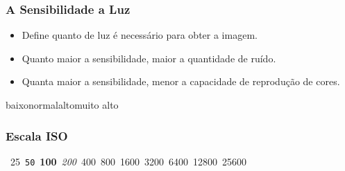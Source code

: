 
\begin{frame}
    \frametitle{A Sensibilidade a Luz}
    \begin{itemize}
        \item Define quanto de luz é necessário para obter a imagem.
        \item Quanto maior a sensibilidade, maior a quantidade de ruído.
        \item Quanta maior a sensibilidade, menor a capacidade de reprodução de cores.
    \end{itemize}
\end{frame}

\begin{frame}
    \hspace{0.5cm}baixo\hspace{0.5cm}normal\hspace{2cm}alto\hspace{3cm}muito alto
    \frametitle{Escala ISO}
    \vfill
    \begin{center}
    \mbox{
    \large 25
    \hfill
    \large \texttt{50}
    \hfill
    \large \textbf{100}
    \hfill
    \large \textit{200}
    \hfill
    \large 400
    \hfill
    \large 800
    \hfill
    \large 1600
    \hfill
    \large 3200
    \hfill
    \large 6400
    \hfill
    \large 12800
    \hfill
    \large 25600
    \hfill
    }
    \end{center}
    \vfill
\end{frame}



